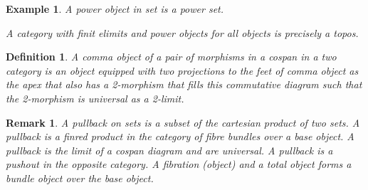 \documentclass{tufte-book}
\newtheorem{definition}[theorem]{Definition}
\newtheorem{example}[theorem]{Example}
\newtheorem{remark}[theorem]{Remark}
\begin{document}
 \begin{example}
     A power object in set is a power set.
 
     A category with finit elimits and power objects for all objects is precisely a topos.
 \end{example}
 
 \begin{definition}
     A comma object of a pair of morphisms in a cospan in a two category is an object equipped with two projections to the feet of comma object as the apex that also has a 2-morphism that fills this commutative diagram such that the 2-morphism is universal as a 2-limit.
 \end{definition}
 
 \begin{remark}
     A pullback on sets is a subset of the cartesian product of two sets. A pullback is a finred product in the category of fibre bundles over a base object. A pullback is the limit of a cospan diagram and are universal. A pullback is a pushout in the opposite category. A fibration (object) and a total object forms a bundle object over the base object.
 \end{remark}
 
\end{document}
